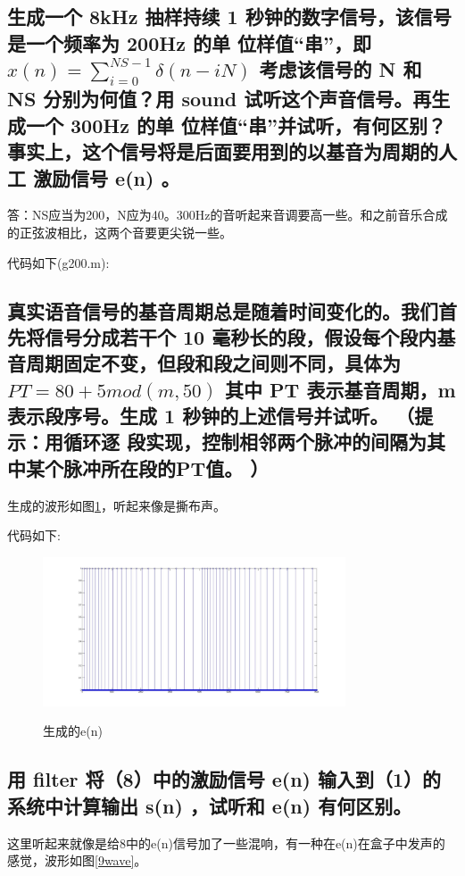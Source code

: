 \documentclass{ctexart}
\begin{document}
\subsection{
生成一个 8kHz 抽样持续 1 秒钟的数字信号，该信号是一个频率为 200Hz 的单
位样值“串”，即
$x(n)=\sum_{i=0}^{NS-1}\delta(n-iN)$
考虑该信号的 N 和 NS 分别为何值？用 sound 试听这个声音信号。再生成一个 300Hz 的单
位样值“串”并试听，有何区别？事实上，这个信号将是后面要用到的以基音为周期的人工
激励信号 e(n) 。
}

答：NS应当为200，N应为40。300Hz的音听起来音调要高一些。和之前音乐合成的正弦波相比，这两个音要更尖锐一些。

代码如下(g200.m):

\subsection{
真实语音信号的基音周期总是随着时间变化的。我们首先将信号分成若干个 10
毫秒长的段，假设每个段内基音周期固定不变，但段和段之间则不同，具体为
$PT = 80 + 5mod(m,50)$
其中 PT 表示基音周期，m 表示段序号。生成 1 秒钟的上述信号并试听。 （提示：用循环逐
段实现，控制相邻两个脉冲的间隔为其中某个脉冲所在段的PT值。 ）
}
生成的波形如图\ref{8wave}，听起来像是撕布声。

代码如下:


\begin{figure}
    \centering
    \includegraphics[width=0.8\textwidth]{8wave.jpg}\\
    \caption{生成的e(n)\label{8wave}}
\end{figure}

\subsection{
用 filter 将（8）中的激励信号 e(n) 输入到（1）的系统中计算输出 s(n) ，试听和
e(n) 有何区别。
}

这里听起来就像是给8中的e(n)信号加了一些混响，有一种在e(n)在盒子中发声的感觉，波形如图\ref{9wave}。
\end{document}
